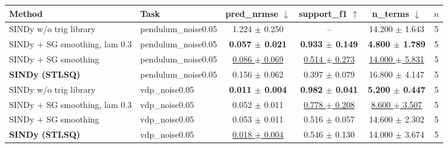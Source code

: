 \begin{tabular}{llcccc}
\toprule
Method & Task & pred\_nrmse $\downarrow$ & support\_f1 $\uparrow$ & n\_terms $\downarrow$ & $n$ \\
\midrule
SINDy w/o trig library & pendulum\_noise0.05 & 1.224 $\pm$ 0.250 & -- & 14.200 $\pm$ 1.643 & 5 \\
SINDy + SG smoothing, lam 0.3 & pendulum\_noise0.05 & \textbf{0.057 $\pm$ 0.021} & \textbf{0.933 $\pm$ 0.149} & \textbf{4.800 $\pm$ 1.789} & 5 \\
SINDy + SG smoothing & pendulum\_noise0.05 & \underline{0.086 $\pm$ 0.069} & \underline{0.514 $\pm$ 0.273} & \underline{14.000 $\pm$ 5.831} & 5 \\
\textbf{SINDy (STLSQ)} & pendulum\_noise0.05 & 0.156 $\pm$ 0.062 & 0.397 $\pm$ 0.079 & 16.800 $\pm$ 4.147 & 5 \\
\midrule
SINDy w/o trig library & vdp\_noise0.05 & \textbf{0.011 $\pm$ 0.004} & \textbf{0.982 $\pm$ 0.041} & \textbf{5.200 $\pm$ 0.447} & 5 \\
SINDy + SG smoothing, lam 0.3 & vdp\_noise0.05 & 0.052 $\pm$ 0.011 & \underline{0.778 $\pm$ 0.208} & \underline{8.600 $\pm$ 3.507} & 5 \\
SINDy + SG smoothing & vdp\_noise0.05 & 0.053 $\pm$ 0.011 & 0.516 $\pm$ 0.057 & 14.600 $\pm$ 2.302 & 5 \\
\textbf{SINDy (STLSQ)} & vdp\_noise0.05 & \underline{0.018 $\pm$ 0.004} & 0.546 $\pm$ 0.130 & 14.000 $\pm$ 3.674 & 5 \\
\bottomrule
\end{tabular}

